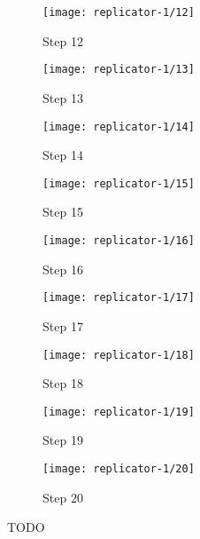 \begin{figure}[!ht]
    \ContinuedFloat
    \centering
    \begin{subfigure}{0.32\textwidth}
        \centering
        \texttt{[image: replicator-1/12]}
        \caption{Step 12}
    \end{subfigure}
    \begin{subfigure}{0.32\textwidth}
        \centering
        \texttt{[image: replicator-1/13]}
        \caption{Step 13}
    \end{subfigure}
    \begin{subfigure}{0.32\textwidth}
        \centering
        \texttt{[image: replicator-1/14]}
        \caption{Step 14}
    \end{subfigure}
    \begin{subfigure}{0.32\textwidth}
        \centering
        \texttt{[image: replicator-1/15]}
        \caption{Step 15}
    \end{subfigure}
    \begin{subfigure}{0.32\textwidth}
        \centering
        \texttt{[image: replicator-1/16]}
        \caption{Step 16}
    \end{subfigure}
    \begin{subfigure}{0.32\textwidth}
        \centering
        \texttt{[image: replicator-1/17]}
        \caption{Step 17}
    \end{subfigure}
    \begin{subfigure}{0.32\textwidth}
        \centering
        \texttt{[image: replicator-1/18]}
        \caption{Step 18}
    \end{subfigure}
    \begin{subfigure}{0.32\textwidth}
        \centering
        \texttt{[image: replicator-1/19]}
        \caption{Step 19}
    \end{subfigure}
    \begin{subfigure}{0.32\textwidth}
        \centering
        \texttt{[image: replicator-1/20]}
        \caption{Step 20}
    \end{subfigure}
    \caption[Replicator 1] {
        TODO
    }
    \label{fig:replicator-1}
\end{figure}
